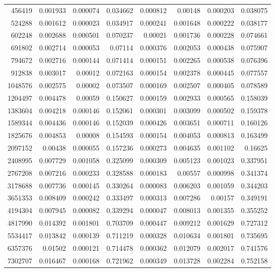 \begin{longtable}{r r r r r r r r}
456419 & 0.001933 & 0.000074 & 0.034662 & 0.000812 & 0.00148 & 0.000203 & 0.038075 \\
524288 & 0.001612 & 0.000023 & 0.034917 & 0.000241 & 0.001648 & 0.000222 & 0.038177 \\
602248 & 0.002688 & 0.000501 & 0.070237 & 0.00021 & 0.001736 & 0.000228 & 0.074661 \\
691802 & 0.002714 & 0.000053 & 0.07114 & 0.000376 & 0.002053 & 0.000438 & 0.075907 \\
794672 & 0.002716 & 0.000144 & 0.071414 & 0.000151 & 0.002265 & 0.000538 & 0.076396 \\
912838 & 0.003017 & 0.00012 & 0.072163 & 0.000154 & 0.002378 & 0.000445 & 0.077557 \\
1048576 & 0.002575 & 0.00002 & 0.073507 & 0.000169 & 0.002507 & 0.000405 & 0.078589 \\
1204497 & 0.004478 & 0.00059 & 0.150627 & 0.000159 & 0.002933 & 0.000565 & 0.158039 \\
1383604 & 0.004218 & 0.000146 & 0.152061 & 0.000301 & 0.003099 & 0.000502 & 0.159378 \\
1589344 & 0.004436 & 0.000146 & 0.152039 & 0.000426 & 0.003651 & 0.000711 & 0.160126 \\
1825676 & 0.004853 & 0.00008 & 0.154593 & 0.000154 & 0.004053 & 0.000813 & 0.163499 \\
2097152 & 0.00438 & 0.000055 & 0.157236 & 0.000273 & 0.004635 & 0.001102 & 0.16625 \\
2408995 & 0.007729 & 0.001058 & 0.325099 & 0.000309 & 0.005123 & 0.001023 & 0.337951 \\
2767208 & 0.007216 & 0.000233 & 0.328588 & 0.000183 & 0.00557 & 0.000998 & 0.341374 \\
3178688 & 0.007736 & 0.000145 & 0.330264 & 0.000083 & 0.006203 & 0.001059 & 0.344203 \\
3651353 & 0.008409 & 0.000242 & 0.333497 & 0.000313 & 0.007286 & 0.00157 & 0.349191 \\
4194304 & 0.007945 & 0.000082 & 0.339294 & 0.000047 & 0.008013 & 0.001355 & 0.355252 \\
4817990 & 0.014392 & 0.001801 & 0.703709 & 0.000447 & 0.009212 & 0.001629 & 0.727312 \\
5534417 & 0.013842 & 0.000139 & 0.711219 & 0.000328 & 0.010634 & 0.001801 & 0.735695 \\
6357376 & 0.01502 & 0.000121 & 0.714478 & 0.000362 & 0.012079 & 0.002017 & 0.741576 \\
7302707 & 0.016467 & 0.000168 & 0.721962 & 0.000349 & 0.013728 & 0.002284 & 0.752158 \\

\end{longtable}

